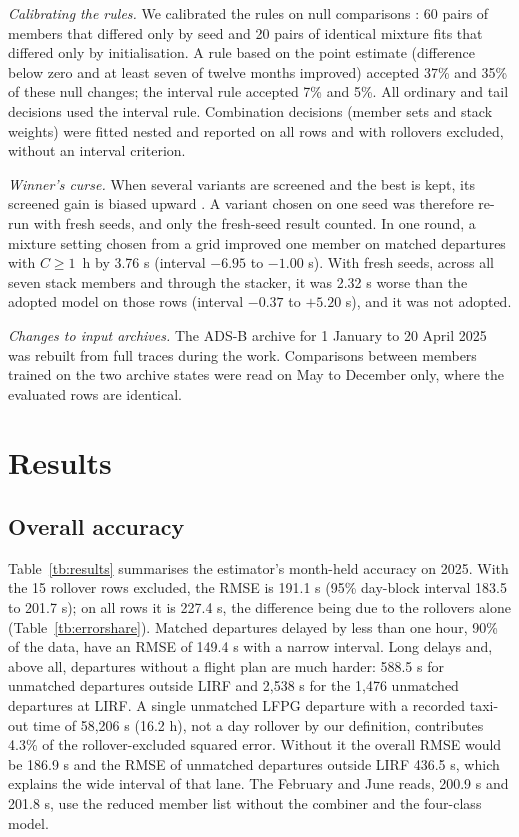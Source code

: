 \documentclass[
  manuscript=article,  %
  layout=preprint,  %
  year=20xx,
  volume=x,
]{extra/joas}
\begin{document}
\textit{Calibrating the rules.} We calibrated the rules on null comparisons \cite{kohavi2009controlled}: 60 pairs of members that differed only by seed and 20 pairs of identical mixture fits that differed only by initialisation. A rule based on the point estimate (difference below zero and at least seven of twelve months improved) accepted 37\% and 35\% of these null changes; the interval rule accepted 7\% and 5\%. All ordinary and tail decisions used the interval rule. Combination decisions (member sets and stack weights) were fitted nested and reported on all rows and with rollovers excluded, without an interval criterion.

\textit{Winner's curse.} When several variants are screened and the best is kept, its screened gain is biased upward \cite{ioannidis2008why,cawley2010overfitting}. A variant chosen on one seed was therefore re-run with fresh seeds, and only the fresh-seed result counted. In one round, a mixture setting chosen from a grid improved one member on matched departures with $C \geq 1$~h by 3.76 s (interval $-6.95$ to $-1.00$ s). With fresh seeds, across all seven stack members and through the stacker, it was 2.32 s worse than the adopted model on those rows (interval $-0.37$ to $+5.20$ s), and it was not adopted.

\textit{Changes to input archives.} The ADS-B archive for 1 January to 20 April 2025 was rebuilt from full traces during the work. Comparisons between members trained on the two archive states were read on May to December only, where the evaluated rows are identical.


\section{Results}
\label{sec:results}

\subsection{Overall accuracy}

Table~\ref{tb:results} summarises the estimator's month-held accuracy on 2025. With the 15 rollover rows excluded, the RMSE is 191.1 s (95\% day-block interval 183.5 to 201.7 s); on all rows it is 227.4 s, the difference being due to the rollovers alone (Table~\ref{tb:errorshare}). Matched departures delayed by less than one hour, 90\% of the data, have an RMSE of 149.4 s with a narrow interval. Long delays and, above all, departures without a flight plan are much harder: 588.5 s for unmatched departures outside LIRF and 2,538 s for the 1,476 unmatched departures at LIRF. A single unmatched LFPG departure with a recorded taxi-out time of 58,206 s (16.2 h), not a day rollover by our definition, contributes 4.3\% of the rollover-excluded squared error. Without it the overall RMSE would be 186.9 s and the RMSE of unmatched departures outside LIRF 436.5 s, which explains the wide interval of that lane. The February and June reads, 200.9 s and 201.8 s, use the reduced member list without the combiner and the four-class model.
\end{document}
